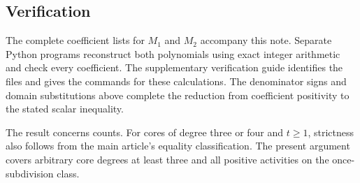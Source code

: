 \documentclass[11pt]{article}
\begin{document}
\subsection{Verification}
The complete coefficient lists for $M_1$ and $M_2$ accompany this note. Separate Python programs reconstruct both polynomials using exact integer arithmetic and check every coefficient. The supplementary verification guide identifies the files and gives the commands for these calculations. The denominator signs and domain substitutions above complete the reduction from coefficient positivity to the stated scalar inequality.

The result concerns counts. For cores of degree three or four and $t\ge1$, strictness also follows from the main article's equality classification. The present argument covers arbitrary core degrees at least three and all positive activities on the once-subdivision class.
\end{document}
